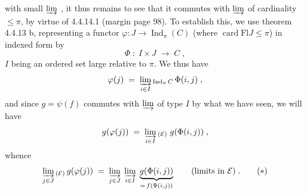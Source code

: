 \documentclass[11pt]{article}
\newcommand{\printedpage}[1]{\marginpar{\footnotesize p.~#1}}
\newcommand{\msp}[1]{\marginpar{\footnotesize [#1]}}
\newcommand{\Ind}{\operatorname{Ind}}
\newcommand{\card}{\operatorname{card}}
\newcommand{\Fl}{\mathrm{Fl}}
\begin{document}
\msp{page 104}
with small $\varinjlim$ , it thus remains to see that it commutes with $\varinjlim$ of cardinality $\leqslant\pi$, by virtue of 4.4.14.1 (margin page 98). To establish this, we use theorem 4.4.13 b, representing a functor $\varphi:J\longrightarrow\Ind_\pi(C)$ (where $\card\Fl J\leqslant\pi$) in indexed form by
\[
\Phi\;:\;I\times J\;\longrightarrow\;C\;, \tag*{(4.4.16.6)}
\]
$I$ being an ordered set large relative to $\pi$. We thus have
\[
\varphi(j)\;=\;\varinjlim_{i\in I}{}_{\Ind_\pi C}\,\Phi(i,j)\;,
\]
and since $g=\psi(f)$ commutes with $\varinjlim$ of type $I$ by what we have seen, we will have
\[
g(\varphi(j))\;=\;\varinjlim_{i\in I}{}_{(\mathcal{E})}\;g(\Phi(i,j))\;,
\]
whence
\[
\varinjlim_{j\in J}{}_{(\mathcal{E})}\,g(\varphi(j))\;=\;\varinjlim_{j\in J}\;\varinjlim_{i\in I}\;\underbrace{g(\Phi(i,j))}_{=\,f(\Phi(i,j))}\qquad\text{(limits in $\mathcal{E}$)}\;. \tag*{$(*)$}
\]
\printedpage{28}
\end{document}
